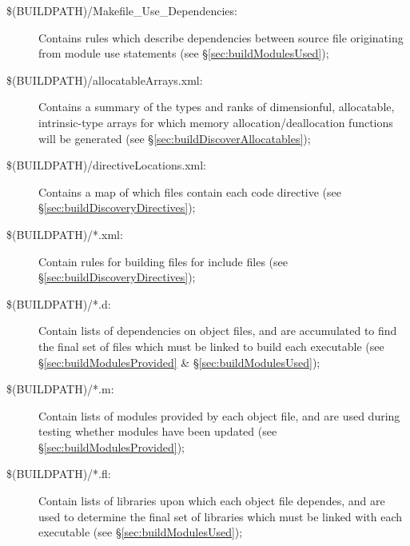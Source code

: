 \begin{description}
\item[{\normalfont \ttfamily \$(BUILDPATH)/Makefile\_Use\_Dependencies}:] Contains rules which describe dependencies between source file originating from module {\normalfont \ttfamily use} statements (see \S\ref{sec:buildModulesUsed});

\item[{\normalfont \ttfamily \$(BUILDPATH)/allocatableArrays.xml}:] Contains a summary of the types and ranks of dimensionful, allocatable, intrinsic-type arrays for which memory allocation/deallocation functions will be generated (see \S\ref{sec:buildDiscoverAllocatables});

\item[{\normalfont \ttfamily \$(BUILDPATH)/directiveLocations.xml}:] Contains a map of which files contain each code directive (see \S\ref{sec:buildDiscoveryDirectives});

\item[{\normalfont \ttfamily \$(BUILDPATH)/*.xml}:] Contain rules for building files for {\normalfont \ttfamily include} files (see \S\ref{sec:buildDiscoveryDirectives});

\item[{\normalfont \ttfamily \$(BUILDPATH)/*.d}:] Contain lists of dependencies on object files, and are accumulated to find the final set of files which must be linked to build each executable (see \S\ref{sec:buildModulesProvided} \& \S\ref{sec:buildModulesUsed});

\item[{\normalfont \ttfamily \$(BUILDPATH)/*.m}:] Contain lists of modules provided by each object file, and are used during testing whether modules have been updated (see \S\ref{sec:buildModulesProvided});

\item[{\normalfont \ttfamily \$(BUILDPATH)/*.fl}:] Contain lists of libraries upon which each object file dependes, and are used to determine the final set of libraries which must be linked with each executable (see \S\ref{sec:buildModulesUsed});


\end{description}
